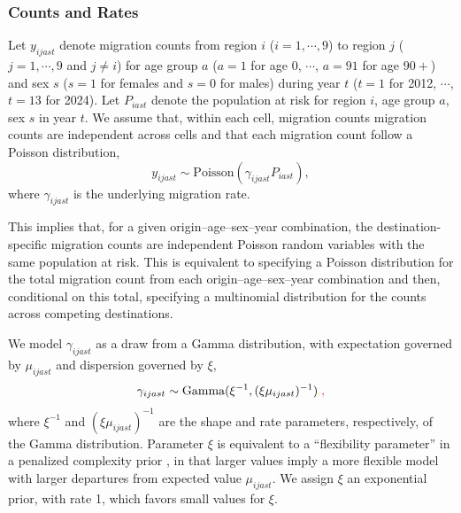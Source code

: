 \documentclass{article}
\begin{document}
\subsubsection{Counts and Rates}
Let $y_{ijast}$ denote migration counts from region $i$ ($i=1,\cdots,9$) to region $j$ ($j=1,\cdots,9$ and $j\neq i$) for age group $a$ ($a=1$ for age 0, $\cdots$, $a=91$ for age $90+$) and sex $s$ ($s=1$ for females and $s=0$ for males) during year $t$
($t=1$ for 2012, $\cdots$, $t=13$ for 2024). Let $P_{iast}$ denote the population at risk for region $i$, age group $a$, sex $s$ in year $t$. We assume that{\color{yellow}, within each cell, migration counts} {\color{magenta}migration counts are independent across cells and that each migration count} follow a Poisson distribution,
\begin{equation}
y_{ijast}\sim\text{Poisson}(\gamma_{ijast}P_{iast}),\label{eq:poisson}
\end{equation}
where $\gamma_{ijast}$ is the underlying migration rate.

{\color{magenta}This implies that, for a given origin–age–sex–year combination, the destination-specific migration counts are independent Poisson random variables with the same population at risk. This is equivalent to specifying a Poisson distribution for the total migration count from each origin–age–sex–year combination and then, conditional on this total, specifying a multinomial distribution for the counts across competing destinations.}

We model $\gamma_{ijast}$ as a draw from a Gamma distribution, with expectation governed by $\mu_{ijast}$ and dispersion governed by $\xi$,
\begin{equation}
 \gamma_{ijast} \sim \text{Gamma}(\xi^{-1}, (\xi \mu_{ijast})^{-1}){\color{yellow}.}{\color{magenta},} \label{eq:priormod1}
\end{equation}
{\color{magenta}where $\xi^{-1}$ and $(\xi \mu_{ijast})^{-1}$ are the shape and rate parameters, respectively, of the Gamma distribution.}
\noindent Parameter $\xi$ is equivalent to a ``flexibility parameter'' in a penalized complexity prior \citep{simpson2017penalising}, in that larger values imply a more flexible model with larger departures from expected value $\mu_{ijast}$. We assign $\xi$ an exponential prior, with rate 1, which favors small values for $\xi$.
\end{document}
